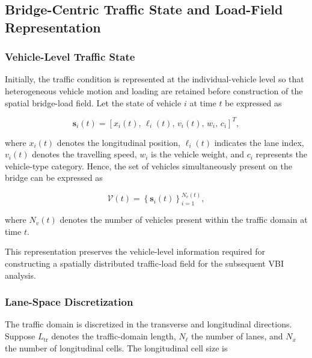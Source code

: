 \documentclass[journal]{IEEEtran}
\begin{document}
\subsection{Bridge-Centric Traffic State and Load-Field Representation}
\label{sec:traffic_state_representation}

\subsubsection{Vehicle-Level Traffic State}
\label{subsec:vehicle_state}

Initially, the traffic condition is represented at the individual-vehicle level so that heterogeneous vehicle motion and loading are retained before construction of the spatial bridge-load field. Let the state of vehicle $i$ at time $t$ be expressed as

\begin{equation}
\mathbf{s}_{i}(t)
=
\left[
x_i(t),\,
\ell_i(t),\,
v_i(t),\,
w_i,\,
c_i
\right]^{T},
\label{eq:vehicle_state}
\end{equation}

where $x_i(t)$ denotes the longitudinal position, $\ell_i(t)$ indicates the lane index, $v_i(t)$ denotes the travelling speed, $w_i$ is the vehicle weight, and $c_i$ represents the vehicle-type category. Hence, the set of vehicles simultaneously present on the bridge can be expressed as

\begin{equation}
\mathcal{V}(t)
=
\left\{
\mathbf{s}_{i}(t)
\right\}_{i=1}^{N_v(t)},
\label{eq:vehicle_set}
\end{equation}

where $N_v(t)$ denotes the number of vehicles present within the traffic domain at time $t$.

This representation preserves the vehicle-level information required for constructing a spatially distributed traffic-load field for the subsequent VBI analysis.


\subsubsection{Lane-Space Discretization}
\label{subsec:lane_space}

The traffic domain is discretized in the transverse and longitudinal directions. Suppose $L_{\mathrm{tr}}$ denotes the traffic-domain length, $N_{\ell}$ the number of lanes, and $N_x$ the number of longitudinal cells. The longitudinal cell size is
\end{document}
